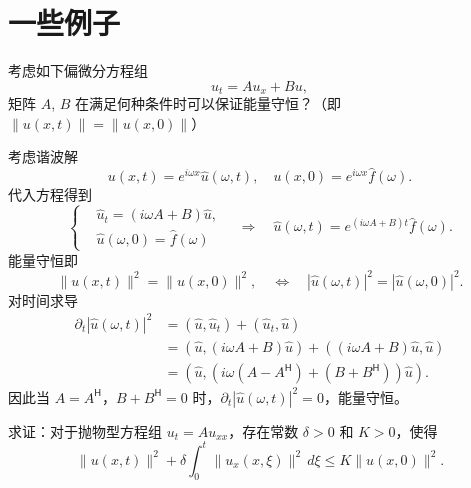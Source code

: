 \section{一些例子}

\begin{example}
    考虑如下偏微分方程组
    \[
        u_t = A u_x + B u,
    \]
    矩阵 $A$, $B$ 在满足何种条件时可以保证能量守恒？（即 $\|u(x,t)\| = \|u(x,0)\|$）
\end{example}

\begin{solution*}
    考虑谐波解
    \[
        u(x,t) = e^{i \omega x} \hat{u}(\omega,t),\quad
        u(x,0) = e^{i \omega x} \hat{f}(\omega).
    \]
    代入方程得到
    \[
        \left\{
        \begin{aligned}
             & \hat{u}_t = (i \omega A + B) \hat{u}, \\
             & \hat{u}(\omega,0) = \hat{f}(\omega)
        \end{aligned}
        \right.
        \quad \Rightarrow \quad
        \hat{u}(\omega,t) = e^{(i \omega A + B)t}\hat{f}(\omega).
    \]
    能量守恒即
    \[
        \| u(x,t) \|^2 =\| u(x,0) \|^2, \quad
        \iff \quad |\hat{u}( \omega,t)|^2 = |\hat{u}( \omega,0)|^2.
    \]
    对时间求导
    \begin{align*}
        \partial_t |\hat{u}( \omega,t)|^2
         & = (\hat{u},\hat{u}_t) + (\hat{u}_t,\hat{u})                               \\
         & = (\hat{u},(i \omega A + B) \hat{u}) + ((i \omega A + B) \hat{u},\hat{u}) \\
         & = (\hat{u},(i \omega (A - A^\mathsf{H}) + (B + B^\mathsf{H}))\hat{u}).
    \end{align*}
    因此当 $A=A^\mathsf{H}$，$B+B^\mathsf{H}=0$ 时，$\partial_t |\hat{u}( \omega,t)|^2=0$，能量守恒。
\end{solution*}

\begin{example}\label{eg:well-posed-1}
    求证：对于抛物型方程组 $u_t = A u_{xx}$，存在常数 $\delta > 0$ 和 $K > 0$，使得
    \[
        \| u(x,t) \|^2 + \delta \int_0^t \| u_x(x,\xi) \|^2 \,d\xi \le K \| u(x,0) \|^2.
    \]
\end{example}

